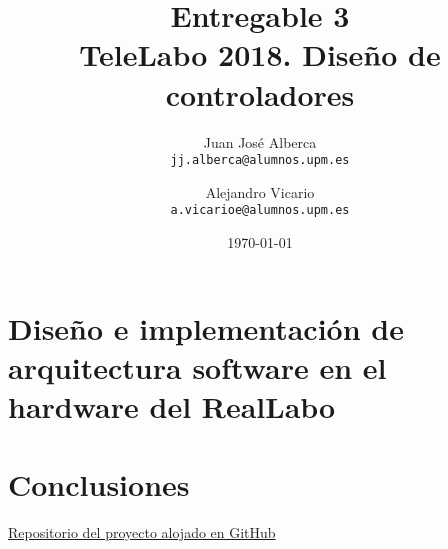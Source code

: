 \documentclass[a4paper]{article}
\begin{document}
\title{Entregable 3 \\
\large TeleLabo 2018. Diseño de controladores}
\author{
	Juan José Alberca\\
	\texttt{jj.alberca@alumnos.upm.es}
	\and
	Alejandro Vicario\\
	\texttt{a.vicarioe@alumnos.upm.es}
}
\date{\today}


\maketitle


\section{Diseño e implementación de arquitectura software en el hardware del RealLabo}


\section{Conclusiones}



\begin{thebibliography}{9}
 \href{https://github.com/avicarioe/telelabo}{Repositorio del proyecto alojado en GitHub}

\end{thebibliography}
\end{document}
